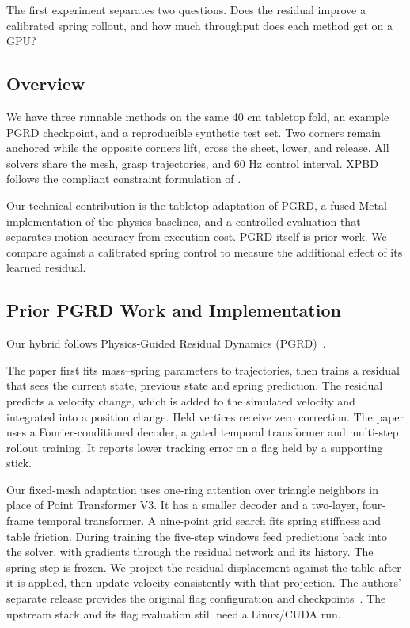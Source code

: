 \documentclass[sigconf]{acmart}
\begin{document}
The first experiment separates two questions. 
Does the residual improve a calibrated spring rollout, and how much throughput does each method get on a GPU?

\subsection{Overview}

We have three runnable methods on the same 40 cm tabletop fold, an example PGRD checkpoint, and a reproducible synthetic test set. Two corners remain anchored while the opposite corners lift, cross the sheet, lower, and release. All solvers share the mesh, grasp trajectories, and 60 Hz control interval. XPBD follows the compliant constraint formulation of \citet{macklin2016xpbd}.

Our technical contribution is the tabletop adaptation of PGRD, a fused Metal implementation of the physics baselines, and a controlled evaluation that separates motion accuracy from execution cost. PGRD itself is prior work. We compare against a calibrated spring control to measure the additional effect of its learned residual. 

\subsection{Prior PGRD Work and Implementation}

Our hybrid follows Physics-Guided Residual Dynamics (PGRD)~\cite{patel2026pgrd}.

The paper first fits mass--spring parameters to trajectories, then trains a residual that sees the current state, previous state and spring prediction. The residual predicts a velocity change, which is added to the simulated velocity and integrated into a position change. Held vertices receive zero correction. The paper uses a Fourier-conditioned decoder, a gated temporal transformer and multi-step rollout training. It reports lower tracking error on a flag held by a supporting stick. 



Our fixed-mesh adaptation uses one-ring attention over triangle neighbors in place of Point Transformer V3. It has a smaller decoder and a two-layer, four-frame temporal transformer. A nine-point grid search fits spring stiffness and table friction. During training the five-step windows feed predictions back into the solver, with gradients through the residual network and its history. The spring step is frozen. We project the residual displacement against the table after it is applied, then update velocity consistently with that projection. The authors' separate release provides the original flag configuration and checkpoints~\cite{pgrdcode}. The upstream stack and its flag evaluation still need a Linux/CUDA run.
\end{document}
